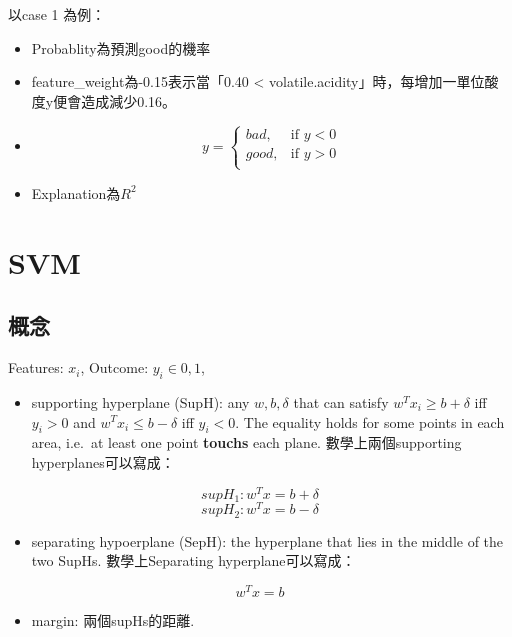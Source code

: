 \documentclass[]{book}
\providecommand{\tightlist}{%
  \setlength{\itemsep}{0pt}\setlength{\parskip}{0pt}}
\begin{document}
以case 1 為例：

\begin{itemize}
\tightlist
\item
  Probablity為預測good的機率
\item
  feature\_weight為-0.15表示當「0.40 \textless{} volatile.acidity」時，每增加一單位酸度y便會造成減少0.16。
\item
  \[y = \left\{\begin{array}{ll}
               bad, & \mbox{if $y<0$} \\  
               good, & \mbox{if $y>0$} \\  
              \end{array} \right.\]
\item
  Explanation為\(R^2\)
\end{itemize}

\hypertarget{svm}{%
\chapter{SVM}\label{svm}}

\hypertarget{-2}{%
\section{概念}\label{-2}}

Features: \(x_i\), Outcome: \(y_i\in {0,1}\),

\begin{itemize}
\tightlist
\item
  supporting hyperplane (SupH): any \(w,b,\delta\) that can satisfy \(w^Tx_i\geq b+\delta\) iff \(y_i>0\) and \(w^Tx_i\leq b-\delta\) iff \(y_i<0\). The equality holds for some points in each area, i.e.~at least one point \textbf{touchs} each plane. 數學上兩個supporting hyperplanes可以寫成：
\end{itemize}

\[supH_1: w^Tx=b+\delta\]
\[supH_2: w^Tx=b-\delta\]

\begin{itemize}
\tightlist
\item
  separating hypoerplane (SepH): the hyperplane that lies in the middle of the two SupHs. 數學上Separating hyperplane可以寫成：
\end{itemize}

\[w^Tx=b\]

\begin{itemize}
\tightlist
\item
  margin: 兩個supHs的距離.
\end{itemize}
\end{document}
